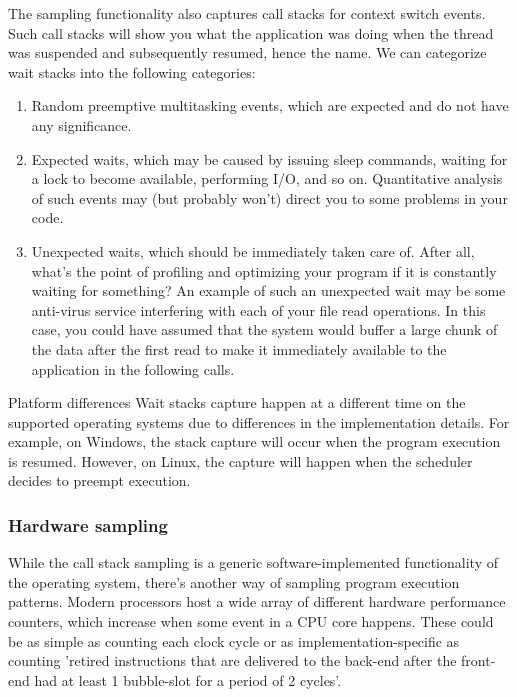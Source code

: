 \documentclass[hidelinks,titlepage,a4paper,twoside]{article}
\begin{document}
The sampling functionality also captures call stacks for context switch events. Such call stacks will show you what the application was doing when the thread was suspended and subsequently resumed, hence the name. We can categorize wait stacks into the following categories:

\begin{enumerate}
\item Random preemptive multitasking events, which are expected and do not have any significance.
\item Expected waits, which may be caused by issuing sleep commands, waiting for a lock to become available, performing I/O, and so on. Quantitative analysis of such events may (but probably won't) direct you to some problems in your code.
\item Unexpected waits, which should be immediately taken care of. After all, what's the point of profiling and optimizing your program if it is constantly waiting for something? An example of such an unexpected wait may be some anti-virus service interfering with each of your file read operations. In this case, you could have assumed that the system would buffer a large chunk of the data after the first read to make it immediately available to the application in the following calls.
\end{enumerate}

\begin{bclogo}[
noborder=true,
couleur=black!5,
logo=\bcattention
]{Platform differences}
Wait stacks capture happen at a different time on the supported operating systems due to differences in the implementation details. For example, on Windows, the stack capture will occur when the program execution is resumed. However, on Linux, the capture will happen when the scheduler decides to preempt execution.
\end{bclogo}

\subsubsection{Hardware sampling}
\label{hardwaresampling}

While the call stack sampling is a generic software-implemented functionality of the operating system, there's another way of sampling program execution patterns. Modern processors host a wide array of different hardware performance counters, which increase when some event in a CPU core happens. These could be as simple as counting each clock cycle or as implementation-specific as counting 'retired instructions that are delivered to the back-end after the front-end had at least 1 bubble-slot for a period of 2 cycles'.
\end{document}

